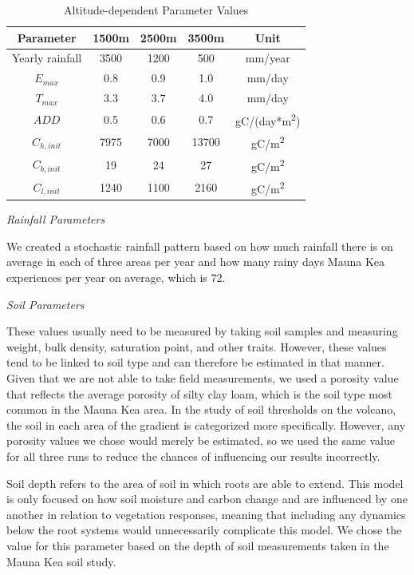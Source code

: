 \documentclass[12pt, letterpaper]{article}
\begin{document}
\begin{table}[p]
\begin{center}
\begin{tabular}{ c c c c c }
Parameter & 1500m & 2500m & 3500m & Unit \\
\hline 
Yearly rainfall & 3500 & 1200 & 500 & mm/year \\
$E_{max}$ & 0.8 & 0.9 & 1.0 & mm/day \\
$T_{max}$ & 3.3 & 3.7 & 4.0 & mm/day \\
$ADD$ & 0.5 & 0.6 & 0.7 & gC/(day*m\textsuperscript{2}) \\
$C_{h,init}$ & 7975 & 7000 & 13700 & gC/m\textsuperscript{2} \\
$C_{b,init}$ & 19 & 24 & 27 & gC/m\textsuperscript{2} \\
$C_{l,init}$ & 1240 & 1100 & 2160 & gC/m\textsuperscript{2} 

\end{tabular}
\end{center}
\caption{\label{tab:table-name}Altitude-dependent Parameter Values}
\end{table}

\emph{Rainfall Parameters}

We created a stochastic rainfall pattern based on how much rainfall there is on average in each of three areas per year and how many rainy days Mauna Kea experiences per year on average, which is 72. \cite{bateman_quantitative_2019,giambelluca_online_2013}

\emph{Soil Parameters}

These values usually need to be measured by taking soil samples and measuring weight, bulk density, saturation point, and other traits. However, these values tend to be linked to soil type and can therefore be estimated in that manner. Given that we are not able to take field measurements, we used a porosity value that reflects the average porosity of silty clay loam, which is the soil type most common in the Mauna Kea area. \cite{hato_soil_1973} In the study of soil thresholds on the volcano, the soil in each area of the gradient is categorized more specifically. \cite{bateman_quantitative_2019} However, any porosity values we chose would merely be estimated, so we used the same value for all three runs to reduce the chances of influencing our results incorrectly. 

Soil depth refers to the area of soil in which roots are able to extend. This model is only focused on how soil moisture and carbon change and are influenced by one another in relation to vegetation responses, meaning that including any dynamics below the root systems would unnecessarily complicate this model. We chose the value for this parameter based on the depth of soil measurements taken in the Mauna Kea soil study. \cite{bateman_quantitative_2019}
\end{document}
